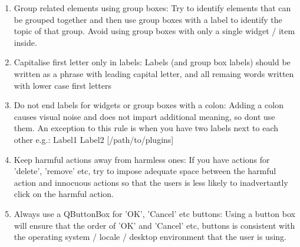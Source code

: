  \begin{enumerate}
 \item Group related elements using group boxes:
   Try to identify elements that can be grouped together and then use 
   group boxes with a label to identify the topic of that group. 
   Avoid using group boxes with only a single widget / item inside.
 \item Capitalise first letter only in labels:
   Labels (and group box labels) should be written as a phrase with leading capital letter,
   and all remaing words written with lower case first letters 
 \item Do not end labels for widgets or group boxes with a colon:
   Adding a colon causes visual noise and does not impart additional meaning,
   so dont use them. An exception to this rule is when you have two labels 
   next to each other e.g.: Label1  Label2 [/path/to/plugins]
 \item Keep harmful actions away from harmless ones:
   If you have actions for 'delete', 'remove' etc, try to impose adequate 
   space between the harmful action and innocuous actions so that the users 
   is less likely to inadvertantly click on the harmful action.
 \item Always use a QButtonBox for 'OK', 'Cancel' etc buttons:
   Using a button box will ensure that the order of 'OK' and 'Cancel' etc, 
   buttons is consistent with the operating system / locale / desktop 
   environment that the user is using.
 \end{enumerate}


